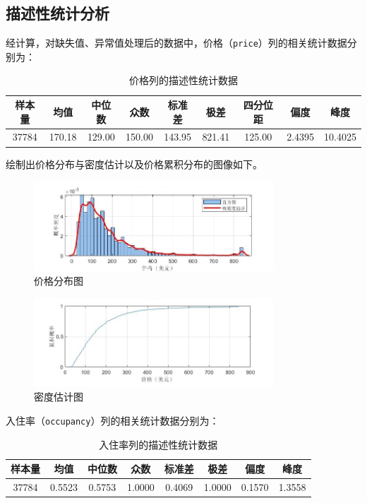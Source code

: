 \documentclass[12pt]{article}
\begin{document}
\begin{CJK}{UTF8}{gbsn}
	\subsection{描述性统计分析}
	经计算，对缺失值、异常值处理后的数据中，价格（\texttt{price}）列的相关统计数据分别为：
	
	\begin{table}[H] %
		\centering
		\begin{tabular}{ccccccccc}
			\toprule
			样本量 & 均值 & 中位数 & 众数 & 标准差 & 极差 & 四分位距 & 偏度 & 峰度 \\
			\midrule
			37784 & 170.18 & 129.00 & 150.00 & 143.95 & 821.41 & 125.00 & 2.4395 & 10.4025 \\
			\bottomrule
		\end{tabular}
		\caption{价格列的描述性统计数据}
	\end{table}
	
	绘制出价格分布与密度估计以及价格累积分布的图像如下。
	
	\begin{figure}[H]
		\centering
		\includegraphics[width=0.8\textwidth]{pic/41.jpg} %
		\caption{价格分布图}
		\label{fig:41}
	\end{figure}
	
	\begin{figure}[H]
		\centering
		\includegraphics[width=0.8\textwidth]{pic/42.jpg} %
		\caption{密度估计图}
		\label{fig:42}
	\end{figure}
	
	入住率（\texttt{occupancy}）列的相关统计数据分别为：
	
	\begin{table}[H] %
		\centering
		\begin{tabular}{cccccccc}
			\toprule
			样本量 & 均值 & 中位数 & 众数 & 标准差 & 极差 & 偏度 & 峰度 \\
			\midrule
			37784 & 0.5523 & 0.5753 & 1.0000 & 0.4069 & 1.0000 & 0.1570 & 1.3558 \\
			\bottomrule
		\end{tabular}
		\caption{入住率列的描述性统计数据}
	\end{table}
	

\end{CJK}
\end{document}
